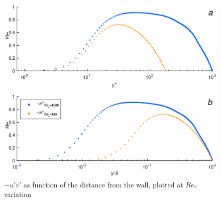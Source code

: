 \begin{figure}
\begin{center}
\includegraphics[scale=0.55]{grafici/uv_comparison}
\caption{$-u'v'$ as function of the distance from the wall, plotted at $Re_{\tau}$ variation}
\label{uv:comparison}
\end{center}
\end{figure}

